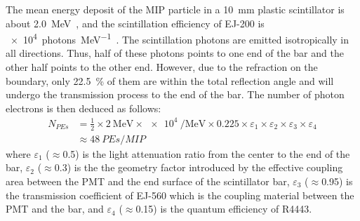 \documentclass[preprint, times]{elsarticle}
\begin{document}
The mean energy deposit of the MIP particle in a \SI{10}{\milli\meter} plastic scintillator is about \SI{2.0}{\mega\electronvolt}~\cite{olive_review_2014}, and the scintillation efficiency of EJ-200 is \SI[per-mode=symbol]{e4}{photons\per\mega\electronvolt}~\cite{scintillator}.
The scintillation photons are emitted isotropically in all directions.
Thus, half of these photons points to one end of the bar and the other half points to the other end.
However, due to the refraction on the boundary, only \SI{22.5}{\percent} of them are within the total reflection angle and will undergo the transmission process to the end of the bar.
The number of photon electrons is then deduced as follows:
\begin{align}
 N_{PEs} &= \frac{1}{2} \times \SI[per-mode=symbol]{2}{\mega\electronvolt} \times \SI{e4}{\per\mega\electronvolt} \times 0.225
           \times \varepsilon_{1} \times \varepsilon_{2} \times \varepsilon_{3} \times \varepsilon_{4} \nonumber \\
         &\approx \SI{48}{PEs\per{MIP}}
\label{eq:pes}
\end{align}
where $\varepsilon_1$ ($\approx$0.5) is the light attenuation ratio from the center to the end of the bar,
$\varepsilon_2$ ($\approx$0.3) is the the geometry factor introduced by the effective coupling area between the PMT and the end surface of the scintillator bar,
$\varepsilon_3$ ($\approx$0.95) is the transmission coefficient of EJ-560 which is the coupling material between the PMT and the bar,
and $\varepsilon_4$ ($\approx$0.15) is the quantum efficiency of R4443.
\end{document}
